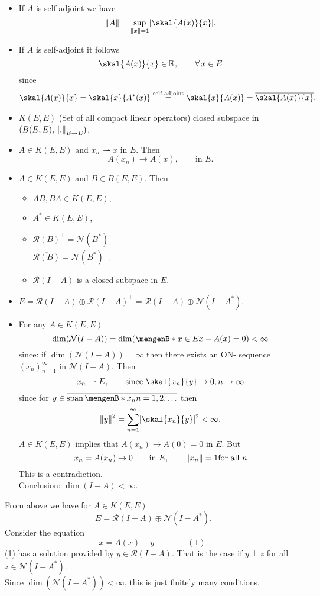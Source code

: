\begin{itemize}
	\item If $A$ is self-adjoint we have
	\[
		\norm{A} = \sup_{\norm{x}=1} \abs{\skal{A(x)}{x}}.
	\]
	\item If $A$ is self-adjoint it follows
	\[
		\skal{A(x)}{x} \in \mathbb{R}, \qquad \forall\, x \in E
	\]
	since
	\begin{align*}
		\skal{A(x)}{x} = \skal{x}{A^*(x)} \stackrel{\text{self-adjoint}}{=} \skal{x}{A(x)} = \overline{\skal{A(x)}{x}}.
	\end{align*} 
	\item $K(E,E)$ (Set of all compact linear operators) closed subspace in $(B(E,E),\norm{.}_{E \to E})$.
	\item $A \in K(E,E)$ and $x_n \rightharpoonup x$ in $E$. Then
	\[
		A(x_n) \to A(x), \qquad \text{in }E.
	\]
	\item $A \in K(E,E)$ and $B \in B(E,E)$. Then
	\begin{itemize}
		\item $AB, BA \in K(E,E)$,
		\item $A^* \in K(E,E)$,
		\item $\mathcal{R}(B)^{\perp} = \mathcal{N}(B^*)$ \\
		$\overline{\mathcal{R}(B)} = \mathcal{N}(B^*)^{\perp}$,
		\item $\mathcal{R}(I-A)$ is a closed subspace in $E$.
	\end{itemize}
	\item $E = \mathcal{R}(I-A) \oplus \mathcal{R}(I-A)^{\perp} = \mathcal{R}(I-A) \oplus \mathcal{N}(I-A^*)$.
	\item For any $A \in K(E,E)$
	\[
		\dim(\mathcal{N}(I-A)) = \dim(\set[x \in E]{x-A(x)=0}) < \infty
	\]
	since: if $\dim(\mathcal{N}(I-A))= \infty$ then there exists an ON- sequence $(x_n)_{n=1}^{\infty}$ in $\mathcal{N}(I-A)$. Then
	\[
		x_n \rightharpoonup E, \qquad \text{since } \skal{x_n}{y} \to 0, n \to \infty
	\]
	since for $y \in \overline{\spn\set[x_n]{n=1,2,\dots}}$ then
	\[
		\norm{y}^2 = \sum_{n=1}^{\infty} \abs{\skal{x_n}{y}}^2 < \infty.
	\]
	$A \in K(E,E)$ implies that $A(x_n) \to A(0)=0$ in $E$. But
	\[
		x_n = A(x_n) \to 0 \qquad \text{in }E, \qquad \norm{x_n}=1 \text{for all }n
	\]
	This is a contradiction. \\
	Conclusion: $\dim(I-A) < \infty$.
\end{itemize}
From above we have for $A \in K(E,E)$ \[
	E = \mathcal{R}(I-A) \oplus \mathcal{N}(I-A^*).
\]
Consider the equation
\[
	x = A(x)+ y \qquad \qquad (1).
\]
(1) has a solution provided by $y \in \mathcal{R}(I-A)$. That is the case if $y \perp z$ for all $z \in \mathcal{N}(I-A^*)$. \\
Since $\dim(\mathcal{N}(I-A^*)) < \infty$, this is just finitely many conditions.


